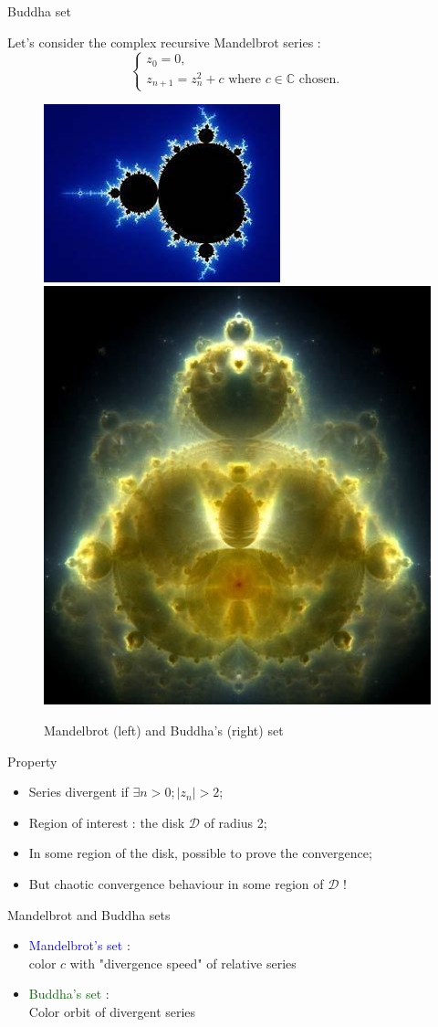 \documentclass[compress,10pt,aspectratio=169]{beamer}
\begin{document}
\begin{frame}[fragile]{Buddha set}
  \scriptsize
  \begin{multicols}{2}
  Let's consider the complex recursive Mandelbrot series :
  \[
  \left\{
  \begin{array}{l}
  z_{0}=0,\\
  z_{n+1} = z_{n}^{2} +c \mbox{ where } c\in\mathbb{C} \mbox{ chosen.}
  \end{array}\right.
  \]

  \begin{figure}[h]
    \includegraphics[width=0.3\linewidth]{../Images/mandelbrot.jpeg}
    \includegraphics[width=0.2\linewidth]{../Images/bhudda.jpg}
    \caption{\small Mandelbrot (left) and Buddha's (right) set}
  \end{figure}
  \end{multicols}

  \begin{multicols}{2}
  \begin{block}{\small Property}
  \begin{itemize}
  \item Series divergent if $\exists n>0; |z_{n}|>2$;
  \item Region of interest : the disk $\mathcal{D}$ of radius 2;
  \item In some region of the disk, possible to prove the convergence;
  \item But chaotic convergence behaviour in some region of $\mathcal{D}$ !
  \end{itemize}
  \end{block}

  \begin{exampleblock}{\small Mandelbrot and Buddha sets}
    \begin{itemize}
    \item \textcolor{blue}{Mandelbrot's set} : \\ color $c$ with  "divergence speed" of relative series
    \item \textcolor{DarkGreen}{Buddha's set} : \\ Color  orbit of divergent series
    \end{itemize}
  \end{exampleblock}
  \end{multicols}
\end{frame}
\end{document}
